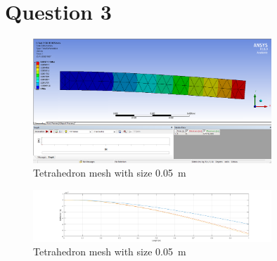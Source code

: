 \documentclass[11pt]{article}
\numberwithin{equation}{section}
\begin{document}
\section{Question 3}
\begin{figure}[H]
  \centering
  \includegraphics[width = 0.8\textwidth]{./img/Q3iDeformation.png}
  \caption{Tetrahedron mesh with size \SI{0.05}{\metre}}
\end{figure}
\begin{figure}[H]
  \centering
  \includegraphics[width = 0.8\textwidth]{./img/q3graph.png}
  \caption{Tetrahedron mesh with size \SI{0.05}{\metre}}
\end{figure}
\end{document}
